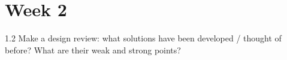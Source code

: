 \documentclass[final]{scrreprt} %
\begin{document}
\chapter{Week 2}
1.2 Make a design review: what solutions have been developed / thought of 
before? What are their weak and strong points?
\end{document}
